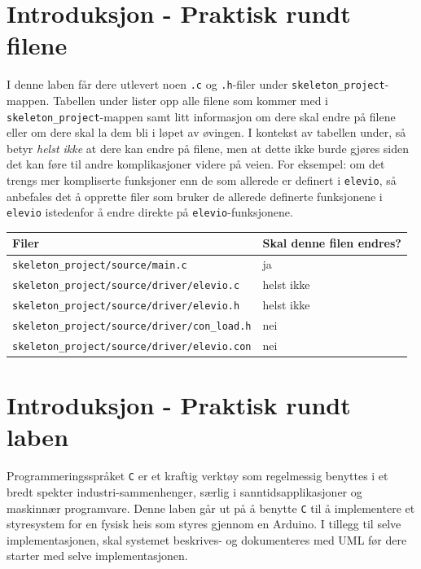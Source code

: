 
\begin{alphasection}

\section{Introduksjon - Praktisk rundt filene}

I denne laben får dere utlevert noen \verb|.c| og \verb|.h|-filer under \verb|skeleton_project|-mappen. Tabellen under lister opp alle filene som kommer med i \verb|skeleton_project|-mappen samt litt informasjon om dere skal endre på filene eller om dere skal la dem bli i løpet av øvingen. I kontekst av tabellen under, så betyr \textit{helst ikke} at dere kan endre på filene, men at dette ikke burde gjøres siden det kan føre til andre komplikasjoner videre på veien. For eksempel: om det trengs mer kompliserte funksjoner enn de som allerede er definert i \verb|elevio|, så anbefales det å opprette filer som bruker de allerede definerte funksjonene i \verb|elevio| istedenfor å endre direkte på \verb|elevio|-funksjonene.

\begin{center}
 \begin{tabular}{|p{8.5cm} p{5.5cm}|} 
 \hline
 Filer & Skal denne filen endres?  \\ [0.5ex] 
 \hline\hline
 \verb|skeleton_project/source/main.c| & \quad \quad \quad \quad ja  \\ 
 \hline
  \verb|skeleton_project/source/driver/elevio.c| &  \quad \quad \quad \quad helst ikke \\ 
 \hline
 \verb|skeleton_project/source/driver/elevio.h| &  \quad \quad \quad \quad helst ikke \\ 
 \hline
  \verb|skeleton_project/source/driver/con_load.h| &  \quad \quad \quad \quad nei \\ 
 \hline
 \verb|skeleton_project/source/driver/elevio.con| &  \quad \quad \quad \quad nei \\ 
 \hline
\end{tabular}
\end{center}


\section{Introduksjon - Praktisk rundt laben}



Programmeringsspråket \verb|C| er et kraftig verktøy som regelmessig benyttes i et bredt spekter industri-sammenhenger, særlig i sanntidsapplikasjoner og maskinnær programvare. Denne laben går ut på å benytte \verb|C| til å implementere et styresystem for en fysisk heis som styres gjennom en Arduino. I tillegg til selve implementasjonen, skal systemet beskrives- og dokumenteres med UML før dere starter med selve implementasjonen.


\end{alphasection}
